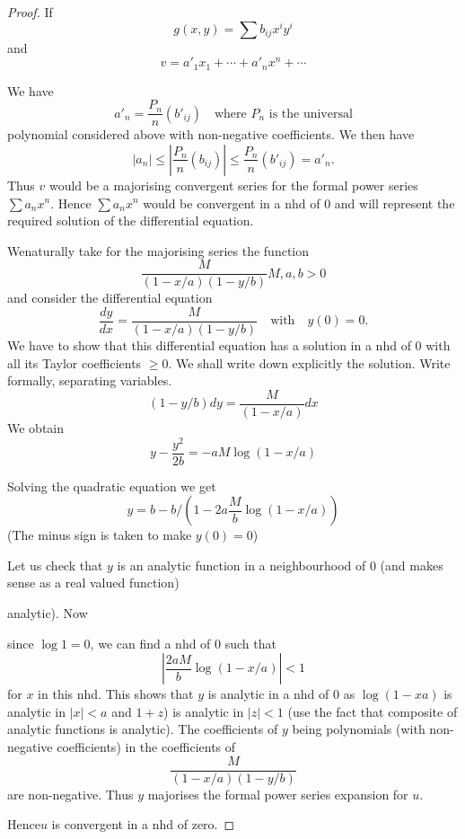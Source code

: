 \begin{proof}
If
$$
g(x,y)=\sum b_{ij}x^{i}y^{i}
$$
and
$$
v=a'_{1}x_{1}+\cdots+a'_{n}x^{n}+\cdots
$$

We have
$$
a'_{n}=\frac{P_{n}}{n}(b'_{ij})\quad\text{where $P_{n}$ is the universal}
$$
polynomial considered above with non-negative coefficients. We then have
$$
|a_{n}|\leq \left| \frac{P_{n}}{n}(b_{ij})\right|\leq \frac{P_{n}}{n}(b'_{ij})=a'_{n}.
$$
Thus $v$ would be a majorising convergent series for the formal power series $\sum a_{n}x^{n}$. Hence $\sum a_{n}x^{n}$ would be convergent in a nhd of 0 and will represent the required solution of the differential equation.

We\pageoriginale naturally take for the majorising series the function
$$
\frac{M}{(1-x/a)(1-y/b)}M,a,b>0
$$
and consider the differential equation
$$
\frac{dy}{dx}=\frac{M}{(1-x/a)(1-y/b)}\quad\text{with}\quad y(0)=0.
$$
We have to show that this differential equation has a solution in a nhd of 0 with all its Taylor coefficients $\geq 0$. We shall write down explicitly the solution. Write formally, separating variables.
$$
(1-y/b)dy=\dfrac{M}{(1-x/a)}dx
$$
We obtain
$$
y-\dfrac{y^{2}}{2b}=-aM\log (1-x/a)
$$

Solving the quadratic equation we get
$$
y=b-b/\left(1-2a\frac{M}{b}\log (1-x/a)\right)
$$
(The minus sign is taken to make $y(0)=0$)

Let us check that $y$ is an analytic function in a neighbourhood of 0 (and makes sense as a real valued function) 

analytic). Now

since $\log 1=0$, we can find a nhd of 0 such that
$$
\left| \frac{2aM}{b}\log (1-x/a)\right|<1
$$
for $x$ in this nhd. This shows that $y$ is analytic in a nhd of 0 as $\log (1-xa)$ is analytic in $|x|<a$ and $1+z$) is analytic in $|z|<1$ (use the fact that composite of analytic functions is analytic). The coefficients of $y$ being polynomials (with non-negative coefficients) in the coefficients of
$$
\frac{M}{(1-x/a)(1-y/b)}
$$
are non-negative. Thus $y$ majorises the formal power series expansion for $u$.

Hence\pageoriginale $u$ is convergent in a nhd of zero.
\end{proof}

